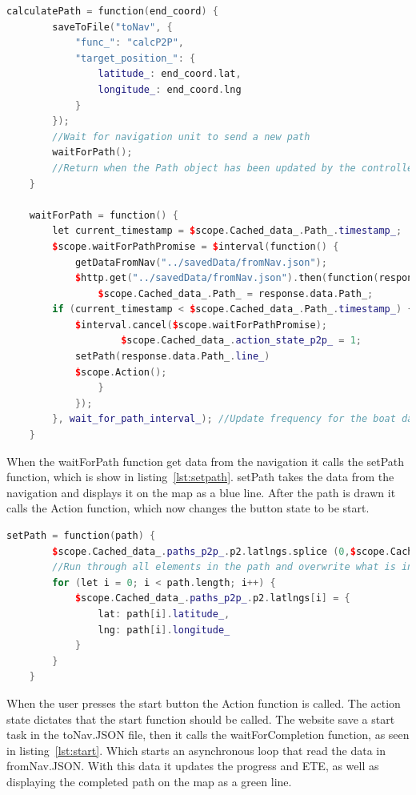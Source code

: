 \begin{lstlisting}[caption = {calculatePath and waitForPath in p2p.js}, captionpos=b, label={lst:calcPath}, language=C++,firstnumber=1]
calculatePath = function(end_coord) {
        saveToFile("toNav", {
            "func_": "calcP2P",
            "target_position_": {
                latitude_: end_coord.lat,
                longitude_: end_coord.lng
            }
        });
        //Wait for navigation unit to send a new path
        waitForPath();
        //Return when the Path object has been updated by the controller
    }

    waitForPath = function() {
        let current_timestamp = $scope.Cached_data_.Path_.timestamp_;
        $scope.waitForPathPromise = $interval(function() {
            getDataFromNav("../savedData/fromNav.json");
            $http.get("../savedData/fromNav.json").then(function(response) {
                $scope.Cached_data_.Path_ = response.data.Path_;
		if (current_timestamp < $scope.Cached_data_.Path_.timestamp_) {
			$interval.cancel($scope.waitForPathPromise);
                	$scope.Cached_data_.action_state_p2p_ = 1;
		 	setPath(response.data.Path_.line_)
			$scope.Action();
                }
            });
        }, wait_for_path_interval_); //Update frequency for the boat data
    }
\end{lstlisting}

When the waitForPath function get data from the navigation it calls the setPath function, which is show in listing~\ref{lst:setpath}. setPath takes the data from the navigation and displays it on the map as a blue line. After the path is drawn it calls the Action function, which now changes the button state to be start.

\begin{lstlisting}[caption = {setPath in p2p.js}, captionpos=b, label={lst:setpath}, language=C++,firstnumber=1]
setPath = function(path) {
		$scope.Cached_data_.paths_p2p_.p2.latlngs.splice (0,$scope.Cached_data_.paths_p2p_.p2.latlngs.length);
		//Run through all elements in the path and overwrite what is in the paths_ object
		for (let i = 0; i < path.length; i++) {
			$scope.Cached_data_.paths_p2p_.p2.latlngs[i] = {
				lat: path[i].latitude_,
				lng: path[i].longitude_
			}
		}
	}
\end{lstlisting}

When the user presses the start button the Action function is called. The action state dictates that the start function should be called.  The website save a start task in the toNav.JSON file, then it calls the waitForCompletion function, as seen in listing~\ref{lst:start}. Which starts an asynchronous loop that read the data in fromNav.JSON. With this data it updates the progress and ETE, as well as displaying the completed path on the map as a green line. 


